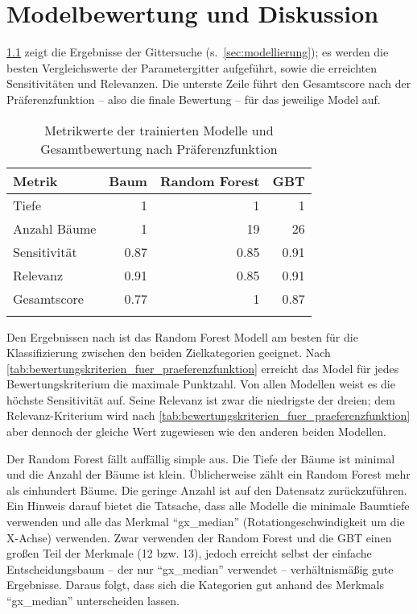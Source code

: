\chapter{Modelbewertung und Diskussion}
\label{ch:modelbewertung}
\cref{tab:metrikwerte_der_trainierten_modelle} zeigt die Ergebnisse der Gittersuche (s.~\cref{sec:modellierung}); es werden die besten Vergleichswerte der Parametergitter aufgeführt, sowie die erreichten Sensitivitäten und Relevanzen. Die unterste Zeile führt den Gesamtscore nach der Präferenzfunktion -- also die finale Bewertung -- für das jeweilige Model auf.

\begin{table}[ht]
	\begin{tabularx}{\textwidth}{lrrr}
		\toprule
		Metrik & Baum & Random Forest & GBT\\
		\midrule
		Tiefe & 1 & 1 & 1\\
		Anzahl Bäume & 1 & 19 & 26\\
		Sensitivität & \num{0.87} & \num{0.85} & \num{0.91}\\
		Relevanz & \num{0.91} & \num{0.85} & \num{0.91}\\
		\midrule
		Gesamtscore & \num{0.77} & \num{1} & \num{0.87}\\
		\bottomrule
		\caption{Metrikwerte der trainierten Modelle und Gesamtbewertung nach Präferenzfunktion}%
	\label{tab:metrikwerte_der_trainierten_modelle}	%
	\end{tabularx}
\end{table}

Den Ergebnissen nach ist das Random Forest Modell am besten für die Klassifizierung zwischen den beiden Zielkategorien geeignet. Nach \cref{tab:bewertungskriterien_fuer_praeferenzfunktion} erreicht das Model für jedes Bewertungskriterium die maximale Punktzahl. Von allen Modellen weist es die höchste Sensitivität auf. Seine Relevanz ist zwar die niedrigste der dreien; dem Relevanz-Kriterium wird nach \cref{tab:bewertungskriterien_fuer_praeferenzfunktion} aber dennoch der gleiche Wert zugewiesen wie den anderen beiden Modellen.

Der Random Forest fällt auffällig simple aus. Die Tiefe der Bäume ist minimal und die Anzahl der Bäume ist klein. Üblicherweise zählt ein Random Forest mehr als einhundert Bäume. Die geringe Anzahl ist auf den Datensatz zurückzuführen. Ein Hinweis darauf bietet die Tatsache, dass alle Modelle die minimale Baumtiefe verwenden und alle das Merkmal \enquote{gx\_median} (Rotationgeschwindigkeit um die X-Achse) verwenden. Zwar verwenden der Random Forest und die GBT einen großen Teil der Merkmale (12 bzw. 13), jedoch erreicht selbst der einfache Entscheidungsbaum -- der nur \enquote{gx\_median} verwendet -- verhältnismäßig gute Ergebnisse. Daraus folgt, dass sich die Kategorien gut anhand des Merkmals \enquote{gx\_median} unterscheiden lassen.

